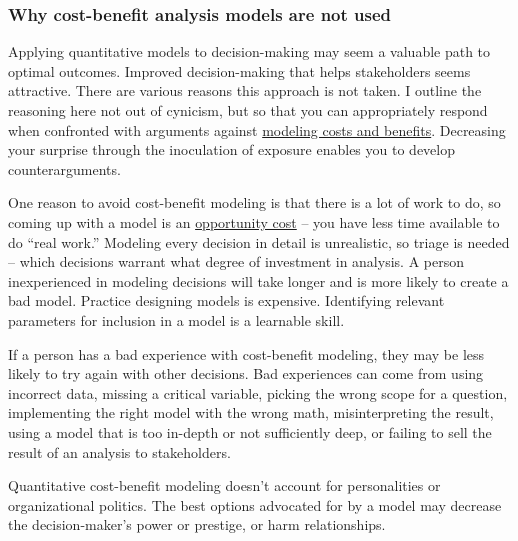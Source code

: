 \subsubsection*{Why cost-benefit analysis models are not used}

Applying quantitative models to decision-making may seem a valuable path to optimal outcomes. Improved decision-making that helps stakeholders seems attractive. There are various reasons this approach is not taken. I outline the reasoning here not out of cynicism, but so that you can appropriately respond when confronted with arguments against \href{https://en.wikipedia.org/wiki/Cost\%E2\%80\%93benefit_analysis}{modeling costs and benefits}.\iftoggle{WPinmargin}{\marginpar{$>$Wikipedia: cost-benefit modeling}}{}
%
Decreasing your surprise through the inoculation of exposure enables you to develop counterarguments. 

One reason to avoid cost-benefit modeling is that there is a lot of work to do, so coming up with a model is an \href{https://en.wikipedia.org/wiki/Opportunity_cost}{opportunity cost} -- you have less time available to do ``real work.'' 
\iftoggle{WPinmargin}{\marginpar{$>$Wikipedia: opportunity cost}}{}
Modeling every decision in detail is unrealistic, so triage is needed -- which decisions warrant what degree of investment in analysis. A person inexperienced in modeling decisions will take longer and is more likely to create a bad model. Practice designing models is expensive. Identifying relevant parameters for inclusion in a model is a learnable skill. 

If a person has a bad experience with cost-benefit modeling, they may be less likely to try again with other decisions. Bad experiences can come from using incorrect data, missing a critical variable, picking the wrong scope for a question, implementing the right model with the wrong math, misinterpreting the result, using a model that is too in-depth or not sufficiently deep, or failing to sell the result of an analysis to stakeholders.

Quantitative cost-benefit modeling doesn't account for personalities or organizational politics. The best options advocated for by a model may decrease the decision-maker's power or prestige, or harm relationships. 

